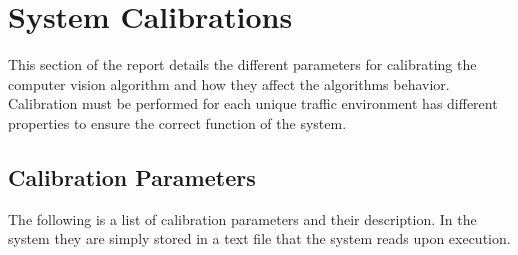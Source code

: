 \chapter{System Calibrations}

This section of the report details the different parameters for calibrating the computer vision algorithm and how they affect the algorithms behavior. Calibration must be performed for each unique traffic environment has different properties to ensure the correct function of the system. 

\section{Calibration Parameters}

The following is a list of calibration parameters and their description. In the system they are simply stored in a text file that the system reads upon execution.

